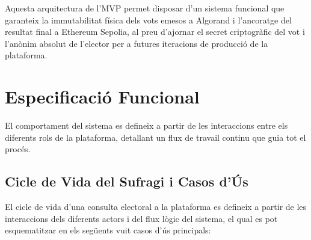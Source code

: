 Aquesta arquitectura de l'\ac{MVP} permet disposar d'un sistema funcional que garanteix la immutabilitat física dels vots
emesos a Algorand i l'ancoratge del resultat final a Ethereum Sepolia, al preu d'ajornar el secret criptogràfic del vot
i l'anònim absolut de l'elector per a futures iteracions de producció de la plataforma.


\section{Especificació Funcional}
\label{sec:especificacio-funcional}

El comportament del sistema es defineix a partir de les interaccions entre els diferents rols de la plataforma,
detallant un flux de travail continu que guia tot el procés.

\subsection{Cicle de Vida del Sufragi i Casos d'Ús}
\label{subsec:casos-d-us}

El cicle de vida d'una consulta electoral a la plataforma es defineix a partir de les interaccions dels diferents actors
i del flux lògic del sistema, el qual es pot esquematitzar en els següents vuit casos d'ús principals:

